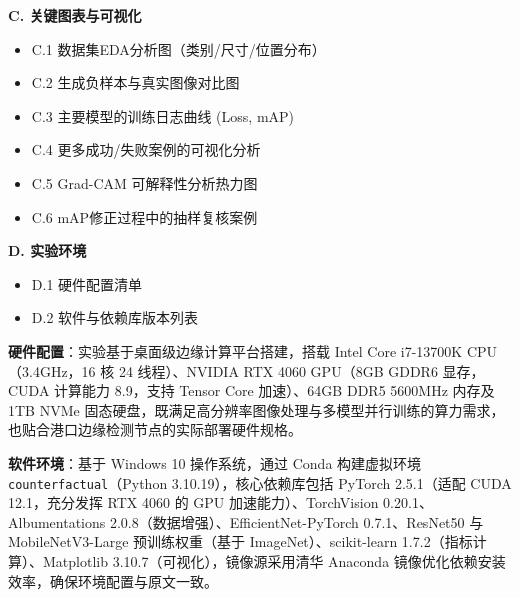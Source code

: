 \documentclass[
]{article}
\begin{document}
\textbf{C. 关键图表与可视化}

\begin{itemize}
\item
  C.1 数据集EDA分析图（类别/尺寸/位置分布）
\item
  C.2 生成负样本与真实图像对比图
\item
  C.3 主要模型的训练日志曲线 (Loss, mAP)
\item
  C.4 更多成功/失败案例的可视化分析
\item
  C.5 Grad-CAM 可解释性分析热力图
\item
  C.6 mAP修正过程中的抽样复核案例
\end{itemize}

\textbf{D. 实验环境}

\begin{itemize}
\item
  D.1 硬件配置清单
\item
  D.2 软件与依赖库版本列表
\end{itemize}

\textbf{硬件配置}：实验基于桌面级边缘计算平台搭建，搭载 Intel Core
i7-13700K CPU（3.4GHz，16 核 24 线程）、NVIDIA RTX 4060 GPU（8GB GDDR6
显存，CUDA 计算能力 8.9，支持 Tensor Core 加速）、64GB DDR5 5600MHz
内存及 1TB NVMe
固态硬盘，既满足高分辨率图像处理与多模型并行训练的算力需求，也贴合港口边缘检测节点的实际部署硬件规格。

\textbf{软件环境}：基于 Windows 10 操作系统，通过 Conda
构建虚拟环境\texttt{counterfactual}（Python 3.10.19），核心依赖库包括
PyTorch 2.5.1（适配 CUDA 12.1，充分发挥 RTX 4060 的 GPU
加速能力）、TorchVision 0.20.1、Albumentations
2.0.8（数据增强）、EfficientNet-PyTorch 0.7.1、ResNet50 与
MobileNetV3-Large 预训练权重（基于 ImageNet）、scikit-learn
1.7.2（指标计算）、Matplotlib 3.10.7（可视化），镜像源采用清华 Anaconda
镜像优化依赖安装效率，确保环境配置与原文一致。
\end{document}
